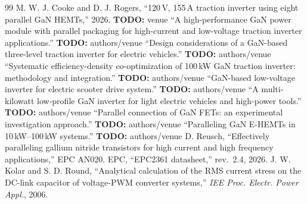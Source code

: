 \documentclass[conference]{IEEEtran}
\newcommand{\todo}[1]{\textcolor{red!70!black}{\textbf{TODO:} #1}}
\begin{document}
\begin{thebibliography}{99}
 M. W. J. Cooke and D. J. Rogers, ``120\,V, 155\,A traction inverter using eight parallel GaN HEMTs,'' 2026. \todo{venue}
 ``A high-performance GaN power module with parallel packaging for high-current and low-voltage traction inverter applications.'' \todo{authors/venue}
 ``Design considerations of a GaN-based three-level traction inverter for electric vehicles.'' \todo{authors/venue}
 ``Systematic efficiency-density co-optimization of 100\,kW GaN traction inverter: methodology and integration.'' \todo{authors/venue}
 ``GaN-based low-voltage inverter for electric scooter drive system.'' \todo{authors/venue}
 ``A multi-kilowatt low-profile GaN inverter for light electric vehicles and high-power tools.'' \todo{authors/venue}
 ``Parallel connection of GaN FETs: an experimental investigation approach.'' \todo{authors/venue}
 ``Paralleling GaN E-HEMTs in 10\,kW--100\,kW systems.'' \todo{authors/venue}
 D. Reusch, ``Effectively paralleling gallium nitride transistors for high current and high frequency applications,'' EPC AN020.
 EPC, ``EPC2361 datasheet,'' rev.~2.4, 2026.
 J. W. Kolar and S. D. Round, ``Analytical calculation of the RMS current stress on the DC-link capacitor of voltage-PWM converter systems,'' \textit{IEE Proc. Electr. Power Appl.}, 2006.
\end{thebibliography}
\end{document}
